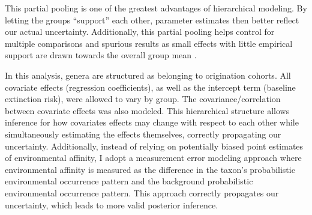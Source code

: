\documentclass[12pt,letterpaper]{article}
\begin{document}
This partial pooling is one of the greatest advantages of hierarchical modeling. By letting the groups ``support'' each other, parameter estimates then better reflect our actual uncertainty. Additionally, this partial pooling helps control for multiple comparisons and spurious results as small effects with little empirical support are drawn towards the overall group mean \citep{Gelman2013d,Gelman2007}. 

In this analysis, genera are structured as belonging to origination cohorts. All covariate effects (regression coefficients), as well as the intercept term (baseline extinction risk), were allowed to vary by group. The covariance/correlation between covariate effects was also modeled. This hierarchical structure allows inference for how covariates effects may change with respect to each other while simultaneously estimating the effects themselves, correctly propagating our uncertainty. Additionally, instead of relying on potentially biased point estimates of environmental affinity, I adopt a measurement error modeling approach where environmental affinity is measured as the difference in the taxon's probabilistic environmental occurrence pattern and the background probabilistic environmental occurrence pattern. This approach correctly propagates our uncertainty, which leads to more valid posterior inference. 
\end{document}

